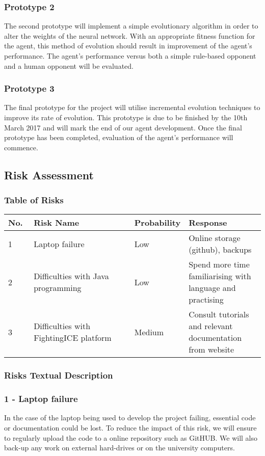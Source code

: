 \documentclass[12pt,a4paper]{article}
\begin{document}
\subsubsection*{Prototype 2}
The second prototype will implement a simple evolutionary algorithm in order to alter the weights of the neural network. With an appropriate fitness function for the agent, this method of evolution should result in improvement of the agent's performance. The agent's performance versus both a simple rule-based opponent and a human opponent will be evaluated.

\subsubsection*{Prototype 3}
The final prototype for the project will utilise incremental evolution techniques to improve its rate of evolution. This prototype is due to be finished by the 10th March 2017 and will mark the end of our agent development. Once the final prototype has been completed, evaluation of the agent's performance will commence.
\newpage
\subsection{Risk Assessment}
\subsubsection{Table of Risks}
\begin{tabular}{|p{0.1\linewidth}|p{0.4\linewidth}|p{0.2\linewidth}|p{0.3\linewidth}|}
\hline
No. & Risk Name & Probability & Response\\ \hline
1 & Laptop failure & Low & Online storage (github), backups\\ \hline
2 & Difficulties with Java programming & Low & Spend more time familiarising with language and practising\\ \hline
3 & Difficulties with FightingICE platform & Medium & Consult tutorials and relevant documentation from website\\ \hline
\end{tabular}
\subsubsection{Risks Textual Description}
\subsubsection*{1 - Laptop failure}
In the case of the laptop being used to develop the project failing, essential code or documentation could be lost. To reduce the impact of this risk, we will ensure to regularly upload the code to a online repository such as GitHUB. We will also back-up any work on external hard-drives or on the university computers.
\end{document}
